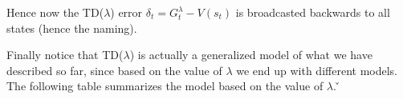 Hence now the TD($\lambda$) error $\delta_t = G_t^{\lambda} - V(s_t) $ is broadcasted backwards to all states (hence
the naming).

\vspace{10pt}


Finally notice that TD($\lambda$) is actually a generalized model of what we have described so far, since based on
the value of $\lambda$ we end up with different models. The following table summarizes the model based on the value
of $\lambda$. \v

